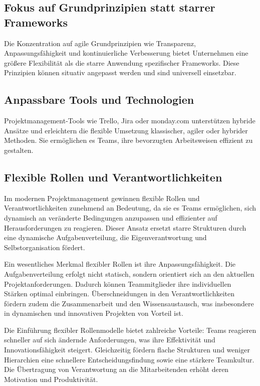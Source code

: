 \documentclass[ngerman]{seminarvorlage}
\begin{document}
\subsection{Fokus auf Grundprinzipien statt starrer Frameworks}
Die Konzentration auf agile Grundprinzipien wie Transparenz, Anpassungsfähigkeit und kontinuierliche Verbesserung bietet Unternehmen eine grö\ss{}ere Flexibilität als die starre Anwendung spezifischer Frameworks. Diese Prinzipien können situativ angepasst werden und sind universell einsetzbar.
\cite{schonfeld_warum_2024}

\subsection{Anpassbare Tools und Technologien}
Projektmanagement-Tools wie Trello, Jira oder monday.com unterstützen hybride Ansätze und erleichtern die flexible Umsetzung klassischer, agiler oder hybrider Methoden. Sie ermöglichen es Teams, ihre bevorzugten Arbeitsweisen effizient zu gestalten.
\cite{marx_top_2024}

\subsection{Flexible Rollen und Verantwortlichkeiten}  
Im modernen Projektmanagement gewinnen flexible Rollen und Verantwortlichkeiten zunehmend an Bedeutung, da sie es Teams ermöglichen, sich dynamisch an veränderte Bedingungen anzupassen und effizienter auf Herausforderungen zu reagieren. Dieser Ansatz ersetzt starre Strukturen durch eine dynamische Aufgabenverteilung, die Eigenverantwortung und Selbstorganisation fördert.  

Ein wesentliches Merkmal flexibler Rollen ist ihre Anpassungsfähigkeit. Die Aufgabenverteilung erfolgt nicht statisch, sondern orientiert sich an den aktuellen Projektanforderungen. Dadurch können Teammitglieder ihre individuellen Stärken optimal einbringen. Überschneidungen in den Verantwortlichkeiten fördern zudem die Zusammenarbeit und den Wissensaustausch, was insbesondere in dynamischen und innovativen Projekten von Vorteil ist.  

Die Einführung flexibler Rollenmodelle bietet zahlreiche Vorteile: Teams reagieren schneller auf sich ändernde Anforderungen, was ihre Effektivität und Innovationsfähigkeit steigert. Gleichzeitig fördern flache Strukturen und weniger Hierarchien eine schnellere Entscheidungsfindung sowie eine stärkere Teamkultur. Die Übertragung von Verantwortung an die Mitarbeitenden erhöht deren Motivation und Produktivität.  
\end{document}
